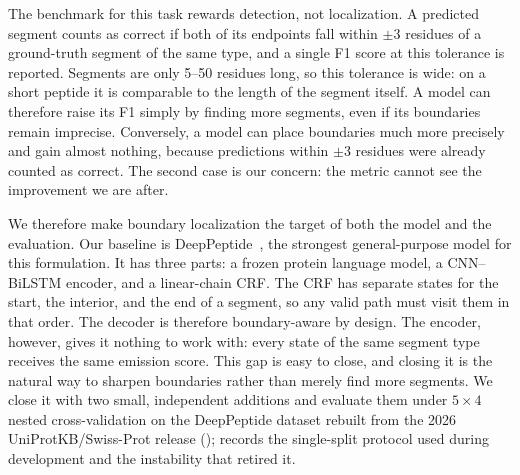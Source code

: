 \documentclass{article}
\begin{document}
The benchmark for this task rewards detection, not localization. A predicted segment counts as correct if both of its endpoints fall within $\pm 3$ residues of a ground-truth segment of the same type, and a single F1 score at this tolerance is reported. Segments are only 5--50 residues long, so this tolerance is wide: on a short peptide it is comparable to the length of the segment itself. A model can therefore raise its F1 simply by finding more segments, even if its boundaries remain imprecise. Conversely, a model can place boundaries much more precisely and gain almost nothing, because predictions within $\pm 3$ residues were already counted as correct. The second case is our concern: the metric cannot see the improvement we are after.

We therefore make boundary localization the target of both the model and the evaluation. Our baseline is DeepPeptide~\citep{deeppeptide2023}, the strongest general-purpose model for this formulation. It has three parts: a frozen protein language model, a CNN--BiLSTM encoder, and a linear-chain CRF. The CRF has separate states for the start, the interior, and the end of a segment, so any valid path must visit them in that order. The decoder is therefore boundary-aware by design. The encoder, however, gives it nothing to work with: every state of the same segment type receives the same emission score. This gap is easy to close, and closing it is the natural way to sharpen boundaries rather than merely find more segments. We close it with two small, independent additions and evaluate them under $5\times4$ nested cross-validation on the DeepPeptide dataset rebuilt from the 2026 UniProtKB/Swiss-Prot release ();  records the single-split protocol used during development and the instability that retired it.

\end{document}
